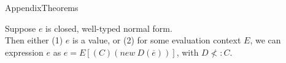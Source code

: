 \documentclass{beamer}
\begin{document}
    \begin{frame}{Appendix}{Theorems}
        \begin{theorem}
            Suppose $e$ is closed, well-typed normal form.\\
            Then either (1) $e$ is a value, or (2) for some evaluation context $E$, we can
            expression $e$ as $e = E[(C)(new~D(\overline{e}))]$, with $D \nless: C$.
        \end{theorem}
    \end{frame}
\end{document}
